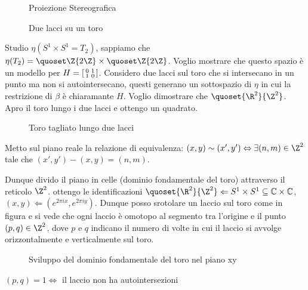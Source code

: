 \begin{figure}
	\centering 
	
	\caption{Proiezione Stereografica}
\end{figure}


\begin{figure}
	\centering 
	
	\caption{Due lacci su un toro}
\end{figure}

Studio $\eta(S^{1} \times S^{1} = T_{2})$, sappiamo che $\eta(T_{2}) = \quoset\Z{2\Z} \times \quoset\Z{2\Z}$. Voglio mostrare che questo spazio è un modello per
$H = \begin{bsmallmatrix} 0 & 1 \\ 1 & 0 \end{bsmallmatrix}$. Considero due lacci sul toro che si intersecano in un punto ma non si autointersecano, questi generano un sottospazio di $\eta$ 
in cui la restrizione di $\beta$ è chiaramante $H$. Voglio dimostrare che $\quoset{\R^2}{\Z^2}$. Apro il toro lungo i due lacci e ottengo un quadrato. 

\begin{figure}
	\centering 
	
	\caption{Toro tagliato lungo due lacci}
\end{figure}

Metto sul piano reale la relazione di equivalenza: $(x, y) \sim (x', y') \Leftrightarrow \exists (n,m) \in \Z^2$ tale che $ (x',y')-(x,y) = (n, m)$.


Dunque divido il piano in celle (dominio fondamentale del toro) attraverso il reticolo $\Z^2$. ottengo le identificazioni 
$\quoset{\R^2}{\Z^2} \Leftarrow S^{1} \times S^{1} \subseteq \mathbb{C} \times \mathbb{C}$, $(x, y) \Leftarrow (e^{2 \pi i x}, e^{2 \pi i y})$.
Dunque posso srotolare un laccio sul toro come in figura e si vede che ogni laccio è omotopo al segmento tra l'origine e il punto $(p, q) \in \Z^2$, dove $p$ e $q$ indicano il
numero di volte in cui il laccio si avvolge orizzontalmente e verticalmente sul toro. 


\begin{figure}
	\centering 
	
	\caption{Sviluppo del dominio fondamentale del toro nel piano xy}
\end{figure}


\begin{teo} 
 $(p, q) =1 \iff $  il laccio non ha autointersezioni
\end{teo}

